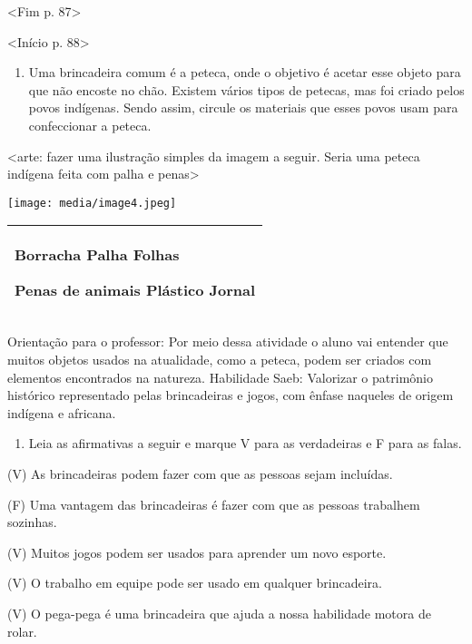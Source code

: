 \textless{}Fim p. 87\textgreater{}

\textless{}Início p. 88\textgreater{}

\begin{enumerate}
\def\labelenumi{\arabic{enumi}.}
\item
  Uma brincadeira comum é a peteca, onde o objetivo é acetar esse objeto
  para que não encoste no chão. Existem vários tipos de petecas, mas foi
  criado pelos povos indígenas. Sendo assim, circule os materiais que
  esses povos usam para confeccionar a peteca.
\end{enumerate}

\textless{}arte: fazer uma ilustração simples da imagem a seguir. Seria
uma peteca indígena feita com palha e penas\textgreater{}

\texttt{[image: media/image4.jpeg]}

\begin{longtable}[]{@{}l@{}}
\toprule
\begin{minipage}[t]{0.97\columnwidth}\raggedright\strut
Borracha Palha Folhas

Penas de animais Plástico Jornal\strut
\end{minipage}\tabularnewline
\bottomrule
\end{longtable}

Orientação para o professor: Por meio dessa atividade o aluno vai
entender que muitos objetos usados na atualidade, como a peteca, podem
ser criados com elementos encontrados na natureza. Habilidade Saeb:
Valorizar o patrimônio histórico representado pelas brincadeiras e
jogos, com ênfase naqueles de origem indígena e africana.

\begin{enumerate}
\def\labelenumi{\arabic{enumi}.}
\item
  Leia as afirmativas a seguir e marque V para as verdadeiras e F para
  as falas.
\end{enumerate}

(V) As brincadeiras podem fazer com que as pessoas sejam incluídas.

(F) Uma vantagem das brincadeiras é fazer com que as pessoas trabalhem
sozinhas.

(V) Muitos jogos podem ser usados para aprender um novo esporte.

(V) O trabalho em equipe pode ser usado em qualquer brincadeira.

(V) O pega-pega é uma brincadeira que ajuda a nossa habilidade motora de
rolar.

